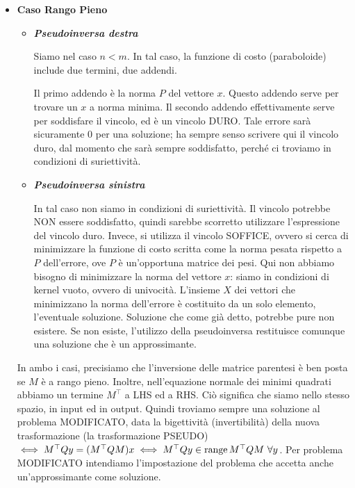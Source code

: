 \begin{itemize}

\item{\textbf{Caso Rango Pieno}}

\begin{itemize}

\item{\textbf{\textit{Pseudoinversa destra}}}

Siamo nel caso $n<m$. In tal caso, la funzione di costo (paraboloide) include due termini, due addendi.

Il primo addendo è la norma $P$ del vettore $x$. Questo addendo serve per trovare un $x$ a norma minima. Il secondo addendo effettivamente serve per soddisfare il vincolo, ed è un vincolo DURO. Tale errore sarà sicuramente 0 per una soluzione; ha sempre senso scrivere qui il vincolo duro, dal momento che sarà sempre soddisfatto, perché ci troviamo in condizioni di suriettività. 

\item{\textbf{\textit{Pseudoinversa sinistra}}}

In tal caso non siamo in condizioni di suriettività. Il vincolo potrebbe NON essere soddisfatto, quindi sarebbe scorretto utilizzare l'espressione del vincolo duro. Invece, si utilizza il vincolo SOFFICE, ovvero si cerca di minimizzare la funzione di costo scritta come la norma pesata rispetto a $P$ dell'errore, ove $P$ è un'opportuna matrice dei pesi. Qui non abbiamo bisogno di minimizzare la norma del vettore $x$: siamo in condizioni di kernel vuoto, ovvero di univocità. L'insieme $X$ dei vettori che minimizzano la norma dell'errore è costituito da un solo elemento, l'eventuale soluzione. Soluzione che come già detto, potrebbe pure non esistere. Se non esiste, l'utilizzo della pseudoinversa restituisce comunque una soluzione che è un approssimante.

\end{itemize}

In ambo i casi, precisiamo che l'inversione delle matrice parentesi è ben posta se $M$ è a rango pieno. Inoltre, nell'equazione normale dei minimi quadrati abbiamo un termine $M^\top$ a LHS ed a RHS. Ciò significa che siamo nello stesso spazio, in input ed in output. Quindi troviamo sempre una soluzione al problema MODIFICATO, data la bigettività (invertibilità) della nuova trasformazione (la trasformazione PSEUDO) $\iff M^\top Qy = (M^\top QM)x \iff M^\top Qy\in\operatorname{range}{M^\top QM}\ \forall y$. Per problema MODIFICATO intendiamo l'impostazione del problema che accetta anche un'approssimante come soluzione.


\end{itemize}
